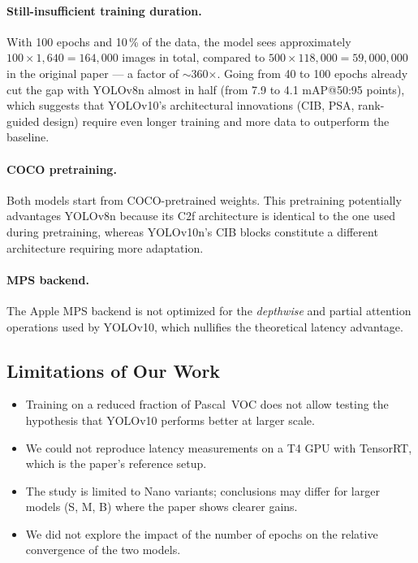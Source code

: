 \documentclass[11pt,a4paper]{article}
\begin{document}
\paragraph{Still-insufficient training duration.}
With 100 epochs and 10\,\% of the data, the model sees approximately $100 \times 1{,}640 = 164{,}000$ images in total, compared to $500 \times 118{,}000 = 59{,}000{,}000$ in the original paper --- a factor of $\sim$360$\times$. Going from 40 to 100 epochs already cut the gap with YOLOv8n almost in half (from 7.9 to 4.1 mAP@50:95 points), which suggests that YOLOv10's architectural innovations (CIB, PSA, rank-guided design) require even longer training and more data to outperform the baseline.

\paragraph{COCO pretraining.}
Both models start from COCO-pretrained weights. This pretraining potentially advantages YOLOv8n because its C2f architecture is identical to the one used during pretraining, whereas YOLOv10n's CIB blocks constitute a different architecture requiring more adaptation.

\paragraph{MPS backend.}
The Apple MPS backend is not optimized for the \emph{depthwise} and partial attention operations used by YOLOv10, which nullifies the theoretical latency advantage.

\subsection{Limitations of Our Work}

\begin{itemize}[noitemsep]
  \item Training on a reduced fraction of Pascal~VOC does not allow testing the hypothesis that YOLOv10 performs better at larger scale.
  \item We could not reproduce latency measurements on a T4 GPU with TensorRT, which is the paper's reference setup.
  \item The study is limited to Nano variants; conclusions may differ for larger models (S, M, B) where the paper shows clearer gains.
  \item We did not explore the impact of the number of epochs on the relative convergence of the two models.
\end{itemize}
\end{document}
